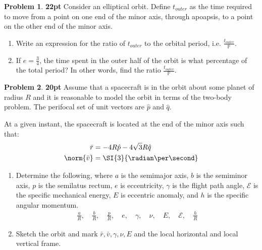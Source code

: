 \documentclass[10pt]{article}
\theoremstyle{definition}
\newtheorem{prob}{Problem}[section]
\newenvironment{subprob}%
{\renewcommand{\theenumi}{\alph{enumi}}\renewcommand{\labelenumi}{(\theenumi)}\begin{enumerate}}%
{\end{enumerate}}%
\begin{document}
\clearpage\newpage
\begin{prob}
    \textbf{22pt}
Consider an elliptical  orbit.
Define \( t_{outer} \) as the time required to move from a point on one end of the minor axis, through apoapsis, to a point on the other end of the minor axis.

\begin{subprob}
    \item Write an expression for the ratio of \( t_{outer} \) to the orbital period, i.e. \(\frac{t_{outer}}{\mathbb{P}}\).
    \item If \( e = \frac{3}{4} \), the time spent in the outer half of the orbit is what percentage of the total period? In other words, find the ratio \( \frac{t_{outer}}{\mathbb{P}} \).
\end{subprob}
\end{prob}

\clearpage\newpage
\begin{prob}
    \textbf{20pt}
    Assume that a spacecraft is in the orbit about some planet of radius \( R\) and it is reasonable to model the orbit in terms of the two-body problem.
    The perifocal set of unit vectors are \( \hat p \) and \( \hat q \).

    At a given instant, the spacecraft is located at the end of the minor axis such that:
    \begin{align*}
        \bar r &= -4 R \hat p - 4 \sqrt{3} R \hat q \\
        \norm{\bar v} &= \SI{3}{\radian\per\second}
    \end{align*}

\begin{subprob}
\item Determine the following, where \( a \) is the semimajor axis, \( b \) is the semiminor axis, \( p \) is the semilatus rectum, \( e \) is eccentricity, \( \gamma \) is the flight path angle, \( \mathcal{E} \) is the specific mechanical energy, \( E \) is eccentric anomaly, and \( h \) is the specific angular momentum.
        \begin{align*}
            \frac{a}{R}, \quad \frac{b}{R}, \quad \frac{p}{R}, \quad e, \quad \gamma, \quad \nu, \quad E, \quad \mathcal{E}, \quad \frac{h}{R}
        \end{align*}
    \item Sketch the orbit and mark \( \bar r, \bar v , \gamma, \nu, E\) and the local horizontal and local vertical frame.
\end{subprob}
\end{prob}
\end{document}
